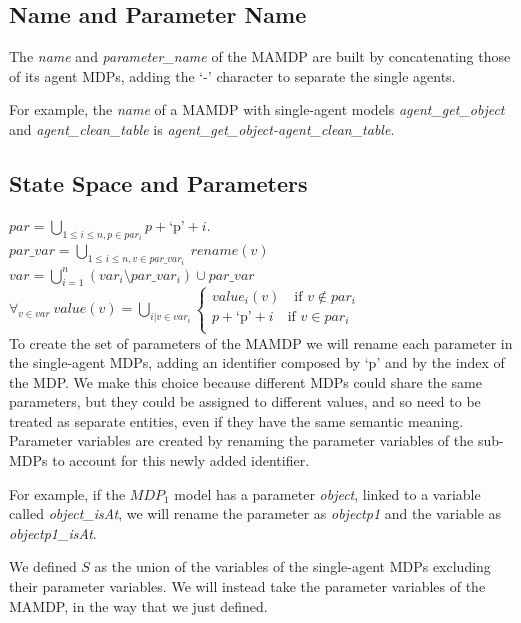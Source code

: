 \subsection{Name and Parameter Name}
The \textit{name} and \textit{parameter\_name} of the MAMDP are built by concatenating those of its agent MDPs, adding the `-' character to separate the single agents.

For example, the \textit{name} of a MAMDP with single-agent models \textit{agent\_get\_object} and  \textit{agent\_clean\_table} is \textit{agent\_get\_object-agent\_clean\_table}.

\subsection{State Space and Parameters}
$par=\bigcup_{1 \leq i \leq n, p \in par_i} p+\text{`p'}+i $. \\
$par\_var=\bigcup_{1 \leq i \leq n, v \in par\_var_i} \> rename(v)$ \\
$var=\bigcup_{i=1}^{n}(var_i \setminus par\_var_i) \cup par\_var$ \\
$\forall_{v \in var}\> value(v)=\bigcup_{i| v \in var_i} 
\begin{cases}
	 value_i(v) \quad \text{if } v \not \in par_i \\
	 p+\text{`p'}+i \quad \text{if } v \in par_i \\
\end{cases}$ \\ 

To create the set of parameters of the MAMDP we will rename each parameter in the single-agent MDPs, adding an identifier composed by `p' and by the index of the MDP. We make this choice because different MDPs could share the same parameters, but they could be assigned to different values, and so need to be treated as separate entities, even if they have the same semantic meaning. Parameter variables are created by renaming the parameter variables of the sub-MDPs to account for this newly added identifier.

For example, if the $MDP_1$ model has a parameter \textit{object}, linked to a variable called \textit{object\_isAt}, we will rename the parameter as \textit{objectp1} and the variable as \textit{objectp1\_isAt}. 

We defined $S$ as the union of the variables of the single-agent MDPs excluding their parameter variables. We will instead take the parameter variables of the MAMDP, in the way that we just defined.

